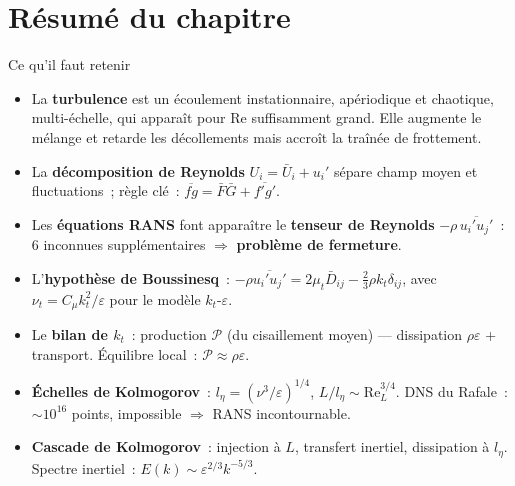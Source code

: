 \documentclass[11pt,a4paper]{report}
\begin{document}
\section*{R\'esum\'e du chapitre}

\begin{importantbox}{Ce qu'il faut retenir}
\begin{itemize}
  \item La \textbf{turbulence} est un \'ecoulement instationnaire, ap\'eriodique et
        chaotique, multi-\'echelle, qui appara\^it pour $\mathrm{Re}$ suffisamment grand.
        Elle augmente le m\'elange et retarde les d\'ecollements mais accro\^it la tra\^in\'ee
        de frottement.

  \item La \textbf{d\'ecomposition de Reynolds} $U_i = \bar{U}_i + u_i'$ s\'epare champ
        moyen et fluctuations~; r\`egle cl\'e~: $\overline{fg} = \bar{F}\bar{G} +
        \overline{f'g'}$.

  \item Les \textbf{\'equations RANS} font appara\^itre le \textbf{tenseur de Reynolds}
        $-\rho\,\overline{u_i'u_j'}$~: 6 inconnues suppl\'ementaires $\Rightarrow$
        \textbf{probl\`eme de fermeture}.

  \item L'\textbf{hypoth\`ese de Boussinesq}~:
        $-\rho\overline{u_i'u_j'} = 2\mu_t\bar{D}_{ij} - \tfrac{2}{3}\rho k_t\delta_{ij}$,
        avec $\nu_t = C_\mu k_t^2/\varepsilon$ pour le mod\`ele $k_t$-$\varepsilon$.

  \item Le \textbf{bilan de $k_t$}~: production $\mathcal{P}$ (du cisaillement moyen)
        --- dissipation $\rho\varepsilon$ + transport. \'Equilibre local~:
        $\mathcal{P} \approx \rho\varepsilon$.

  \item \textbf{\'Echelles de Kolmogorov}~: $l_\eta = (\nu^3/\varepsilon)^{1/4}$,
        $L/l_\eta \sim \mathrm{Re}_L^{3/4}$. DNS du Rafale~: $\sim 10^{16}$ points,
        impossible $\Rightarrow$ RANS incontournable.

  \item \textbf{Cascade de Kolmogorov}~: injection \`a $L$, transfert inertiel,
        dissipation \`a $l_\eta$. Spectre inertiel~: $E(k) \sim \varepsilon^{2/3} k^{-5/3}$.
\end{itemize}
\end{importantbox}
\end{document}
